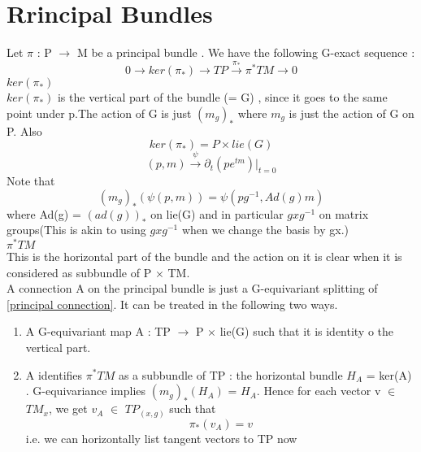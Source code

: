 \documentclass[psamsfonts]{amsart}
\theoremstyle{definition}
\theoremstyle{remark}
\numberwithin{equation}{section}
\begin{document}
\section{Rrincipal Bundles}
Let $\pi$ : P $\to$ M be a principal bundle .
We have the following G-exact sequence :
\begin{equation}\label{principal connection}
	0 \rightarrow ker(\pi_{*})  \rightarrow TP \xrightarrow{\pi_{*}}  \pi^{*}TM \rightarrow 0                  
\end{equation}
\textbf{$ker(\pi_{*})$} \\                           
$ker(\pi_{*})$ is the vertical part of the bundle (= G) , since it goes to the same point under p.The action of G is just $(m_{g})_{*}$ where $m_{g}$ is just the action of G on P. Also
\[ ker(\pi_{*}) = P \times lie(G) \]
\[ (p,m) \xrightarrow{\psi} \partial_{t}(pe^{tm})\vert_{t=0}\]
Note that 
\[(m_{g})_{*}(\psi(p,m)) = \psi(pg^{-1} , Ad(g)m) \]
where Ad(g) = $(ad(g))_{*}$ on  lie(G) and in particular $gxg^{-1}$ on matrix groups(This is akin to using $gxg^{-1}$ when we change the basis by gx.)
\\
\textbf{$\pi^{*}TM$}  \\
This is the horizontal part of the bundle and the action on it is clear when it is considered as subbundle of P $\times$ TM. 
\\
A connection A on the principal bundle is just a G-equivariant splitting of \cref{principal connection}. It can be treated in the following two ways.
\begin{enumerate}
	\item A G-equivariant map A : TP $\to$ P $\times$ lie(G) such that it is identity o the vertical part.
	\item A identifies $\pi^{*}TM$ as a subbundle of TP : the horizontal bundle $H_{A}$ = ker(A) . G-equivariance implies $(m_{g})_{*}(H_{A})$ = $H_{A}$. Hence for each vector v $\in$ $TM_{x}$, we get $v_{A}$ $\in$ $TP_{(x,g)}$ such that 
	\[ \pi_{*}(v_{A}) = v \]
	i.e. we can horizontally list tangent vectors to TP now
\end{enumerate}
\end{document}
